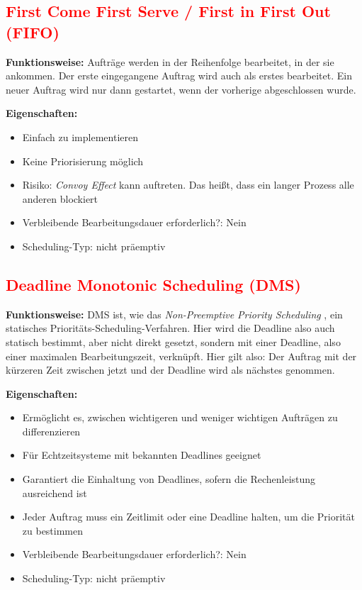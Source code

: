 \documentclass[
    12pt,               
    a4paper,            
    ngerman,            
    parskip=half,       
    headings=normal,   
    numbers=enddot,     
    toc=chapterentrywithdots 
]{scrreprt}\usepackage[utf8]{inputenc}
\begin{document}
\subsection{\textcolor{red}{First Come First Serve / First in First Out (FIFO)}}
\textbf{Funktionsweise:} Aufträge werden in der Reihenfolge bearbeitet, in der sie ankommen. Der erste eingegangene Auftrag wird auch als erstes bearbeitet. Ein neuer Auftrag wird nur dann gestartet, wenn der vorherige abgeschlossen wurde.\citep[Vgl.][S.156f]{tanenbaum2015}

\textbf{Eigenschaften:}
\begin{itemize}
    \item[+] Einfach zu implementieren
    \item[-] Keine Priorisierung möglich
    \item[-] Risiko: \textit{Convoy Effect} \citep[Vgl.][S.157]{tanenbaum2015} kann auftreten. Das heißt, dass ein langer Prozess alle anderen blockiert
    \item Verbleibende Bearbeitungsdauer erforderlich?: Nein
    \item Scheduling-Typ: nicht präemptiv
\end{itemize}

\subsection{\textcolor{red}{Deadline Monotonic Scheduling (DMS)}}
\textbf{Funktionsweise:} DMS ist, wie das \textit{Non-Preemptive Priority Scheduling} , ein statisches Prioritäts-Scheduling-Verfahren. Hier wird die Deadline also auch statisch bestimmt, aber nicht direkt gesetzt, sondern mit einer Deadline, also einer maximalen Bearbeitungszeit, verknüpft. Hier gilt also: Der Auftrag mit der kürzeren Zeit zwischen jetzt und der Deadline wird als nächstes genommen.\citep[Vgl.][S.30f]{salfner2010priority}

\textbf{Eigenschaften:}
\begin{itemize}
    \item[+] Ermöglicht es, zwischen wichtigeren und weniger wichtigen Aufträgen zu differenzieren
    \item[+] Für Echtzeitsysteme mit bekannten Deadlines geeignet
    \item[+] Garantiert die Einhaltung von Deadlines, sofern die Rechenleistung ausreichend ist
    \item Jeder Auftrag muss ein Zeitlimit oder eine Deadline halten, um die Priorität zu bestimmen
    \item Verbleibende Bearbeitungsdauer erforderlich?: Nein
    \item Scheduling-Typ: nicht präemptiv
\end{itemize}
\end{document}

